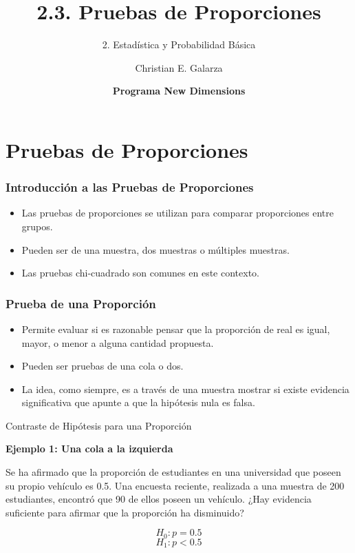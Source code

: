 \documentclass[aspectratio=169]{beamer}
\title[2.3. Pruebas de Proporciones]{\Huge 2.3. Pruebas de Proporciones}
\subtitle{2. Estadística y Probabilidad Básica}
\author{Christian E. Galarza}
\date{\bf Programa New Dimensions}
\begin{document}
\frame{\titlepage}

\section{Pruebas de Proporciones}

\begin{frame}
\frametitle{Introducción a las Pruebas de Proporciones}

\begin{itemize}
    \item Las pruebas de proporciones se utilizan para comparar proporciones entre grupos.
    \item Pueden ser de una muestra, dos muestras o múltiples muestras.
    \item Las pruebas chi-cuadrado son comunes en este contexto.
\end{itemize}

\end{frame}

\begin{frame}
\frametitle{Prueba de una Proporción}

\begin{itemize}
    \item Permite evaluar si es razonable pensar que la proporción de real es igual, mayor, o menor a alguna cantidad propuesta.
    \item Pueden ser pruebas de una cola o dos.
    \item La idea, como siempre, es a través de una muestra mostrar si existe evidencia significativa que apunte a que la hipótesis nula es falsa.
\end{itemize}

\end{frame}


\begin{frame}{Contraste de Hipótesis para una Proporción}

\textbf{Ejemplo 1: Una cola a la izquierda}


Se ha afirmado que la proporción de estudiantes en una universidad que poseen su propio vehículo es 0.5. Una encuesta reciente, realizada a una muestra de 200 estudiantes, encontró que 90 de ellos poseen un vehículo. ¿Hay evidencia suficiente para afirmar que la proporción ha disminuido?

\[ H_0: p = 0.5 \]
\[ H_1: p < 0.5 \]






\end{frame}
\end{document}
